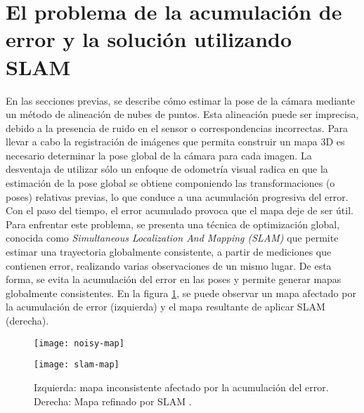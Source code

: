\section{El problema de la acumulación de error y la solución utilizando SLAM}
\label{sec:acumulacion-del-error-slam}

En las secciones previas, se describe cómo estimar la pose de la cámara mediante un método de alineación de nubes de puntos. Esta alineación puede ser imprecisa, debido a la presencia de ruido en el sensor o correspondencias incorrectas. Para llevar a cabo la registración de imágenes que permita construir un mapa 3D es necesario determinar la pose global de la cámara para cada imagen. La desventaja de utilizar sólo un enfoque de odometría visual radica en que la estimación de la pose global se obtiene componiendo las transformaciones (o poses) relativas previas, lo que conduce a una acumulación progresiva del error. Con el paso del tiempo, el error acumulado provoca que el mapa deje de ser útil. \\
Para enfrentar este problema, se presenta una técnica de optimización global, conocida como \textit{Simultaneous Localization And Mapping (SLAM)} que permite estimar una trayectoria globalmente consistente, a partir de mediciones que contienen error, realizando varias observaciones de un mismo lugar. De esta forma, se evita la acumulación del error en las poses y permite generar mapas globalmente consistentes. En la figura \ref{fig:maps-noisy-slam}, se puede observar un mapa afectado por la acumulación de error (izquierda) y el mapa resultante de aplicar SLAM (derecha). \\

\begin{figure}[ht]
\centering
\begin{minipage}[h]{.45\textwidth}
\begin{center}
\texttt{[image: noisy-map]}
\end{center}
\end{minipage}
\hfill
\begin{minipage}[h]{.45\textwidth}
\begin{center}
\texttt{[image: slam-map]}
\end{center}
\end{minipage}
\hfill
\caption[Efecto de la acumulación del error y optimización con SLAM sobre un mapa]
{Izquierda: mapa inconsistente afectado por la acumulación del error. Derecha: Mapa refinado por SLAM \cite{GrisettiKSB10}.}
\label{fig:maps-noisy-slam}
\end{figure}

